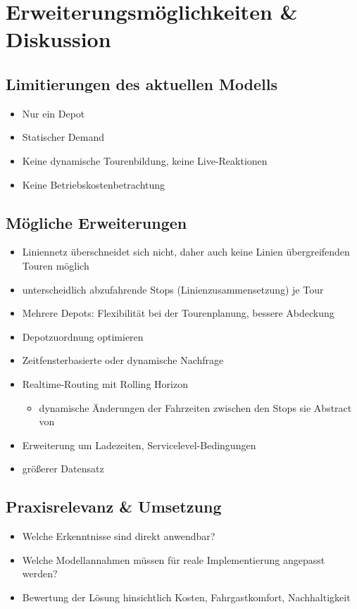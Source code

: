 \chapter{Erweiterungsmöglichkeiten \& Diskussion}
\section{Limitierungen des aktuellen Modells}
\begin{itemize}
    \item Nur ein Depot
    \item Statischer Demand
    \item Keine dynamische Tourenbildung, keine Live-Reaktionen
    \item Keine Betriebskostenbetrachtung
\end{itemize}

\section{Mögliche Erweiterungen}
\begin{itemize}
    \item Liniennetz überschneidet sich nicht, daher auch keine Linien übergreifenden Touren möglich
    \item unterscheidlich abzufahrende Stops (Linienzusammensetzung) je Tour
    \item Mehrere Depots: Flexibilität bei der Tourenplanung, bessere Abdeckung
    \item Depotzuordnung optimieren
    \item Zeitfensterbasierte oder dynamische Nachfrage
    \item Realtime-Routing mit Rolling Horizon
    \begin{itemize}
        \item dynamische Änderungen der Fahrzeiten zwischen den Stops sie Abstract von \textcite{lian_-demand_2023} 
    \end{itemize}
    \item Erweiterung um Ladezeiten, Servicelevel-Bedingungen
    \item größerer Datensatz
\end{itemize}

\section{Praxisrelevanz \& Umsetzung}
\begin{itemize}
    \item Welche Erkenntnisse sind direkt anwendbar?
    \item Welche Modellannahmen müssen für reale Implementierung angepasst werden?
    \item Bewertung der Lösung hinsichtlich Kosten, Fahrgastkomfort, Nachhaltigkeit
\end{itemize}

